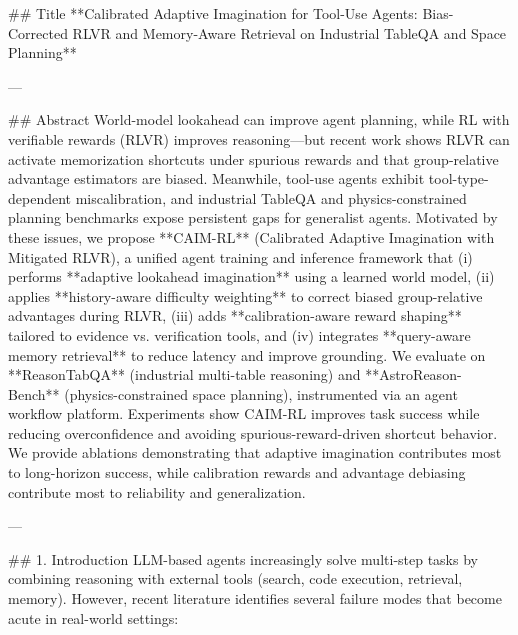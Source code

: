 ## Title  
**Calibrated Adaptive Imagination for Tool-Use Agents: Bias-Corrected RLVR and Memory-Aware Retrieval on Industrial TableQA and Space Planning**

---

## Abstract  
World-model lookahead can improve agent planning, while RL with verifiable rewards (RLVR) improves reasoning—but recent work shows RLVR can activate memorization shortcuts under spurious rewards and that group-relative advantage estimators are biased. Meanwhile, tool-use agents exhibit tool-type-dependent miscalibration, and industrial TableQA and physics-constrained planning benchmarks expose persistent gaps for generalist agents. Motivated by these issues, we propose **CAIM-RL** (Calibrated Adaptive Imagination with Mitigated RLVR), a unified agent training and inference framework that (i) performs **adaptive lookahead imagination** using a learned world model, (ii) applies **history-aware difficulty weighting** to correct biased group-relative advantages during RLVR, (iii) adds **calibration-aware reward shaping** tailored to evidence vs. verification tools, and (iv) integrates **query-aware memory retrieval** to reduce latency and improve grounding. We evaluate on **ReasonTabQA** (industrial multi-table reasoning) and **AstroReason-Bench** (physics-constrained space planning), instrumented via an agent workflow platform. Experiments show CAIM-RL improves task success while reducing overconfidence and avoiding spurious-reward-driven shortcut behavior. We provide ablations demonstrating that adaptive imagination contributes most to long-horizon success, while calibration rewards and advantage debiasing contribute most to reliability and generalization.

---

## 1. Introduction  
LLM-based agents increasingly solve multi-step tasks by combining reasoning with external tools (search, code execution, retrieval, memory). However, recent literature identifies several failure modes that become acute in real-world settings:

